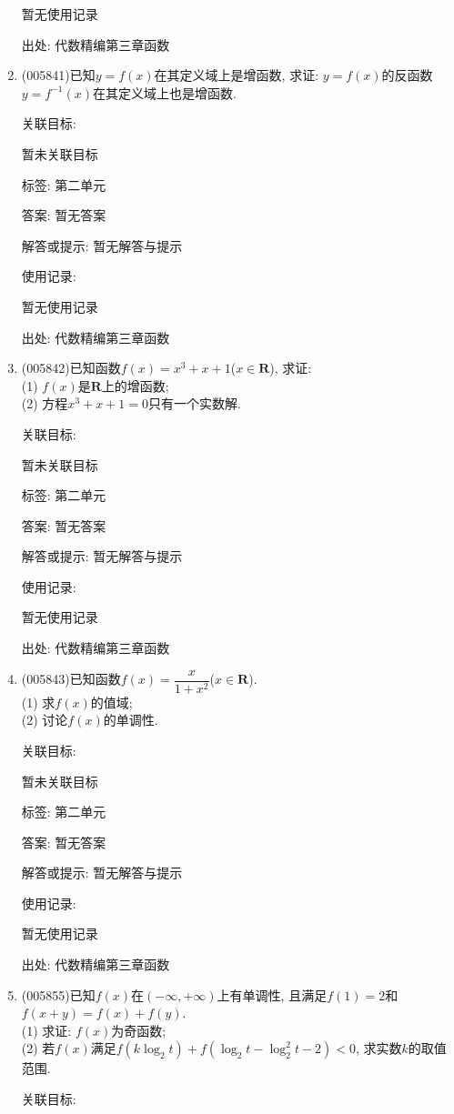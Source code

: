 \documentclass[10pt,a4paper]{article}
\begin{document}
\begin{enumerate}[1.]
暂无使用记录


出处: 代数精编第三章函数
\item { (005841)}已知$y=f(x)$在其定义域上是增函数, 求证: $y=f(x)$的反函数$y=f^{-1}(x)$在其定义域上也是增函数.


关联目标:

暂未关联目标



标签: 第二单元

答案: 暂无答案

解答或提示: 暂无解答与提示

使用记录:

暂无使用记录


出处: 代数精编第三章函数
\item { (005842)}已知函数$f(x)=x^3+x+1$($x\in \mathbf{R}$), 求证:\\
(1) $f(x)$是$\mathbf{R}$上的增函数;\\
(2) 方程$x^3+x+1=0$只有一个实数解.


关联目标:

暂未关联目标



标签: 第二单元

答案: 暂无答案

解答或提示: 暂无解答与提示

使用记录:

暂无使用记录


出处: 代数精编第三章函数
\item { (005843)}已知函数$f(x)=\dfrac x{1+x^2}$($x\in \mathbf{R}$).\\
(1) 求$f(x)$的值域;\\
(2) 讨论$f(x)$的单调性.


关联目标:

暂未关联目标



标签: 第二单元

答案: 暂无答案

解答或提示: 暂无解答与提示

使用记录:

暂无使用记录


出处: 代数精编第三章函数
\item { (005855)}已知$f(x)$在$(-\infty ,+\infty)$上有单调性, 且满足$f(1)=2$和$f(x+y)=f(x)+f(y)$.\\
(1) 求证: $f(x)$为奇函数;\\
(2) 若$f(x)$满足$f(k\log_2t)+f(\log_2t-\log_2^2t-2)<0$, 求实数$k$的取值范围.


关联目标:


\end{enumerate}
\end{document}
